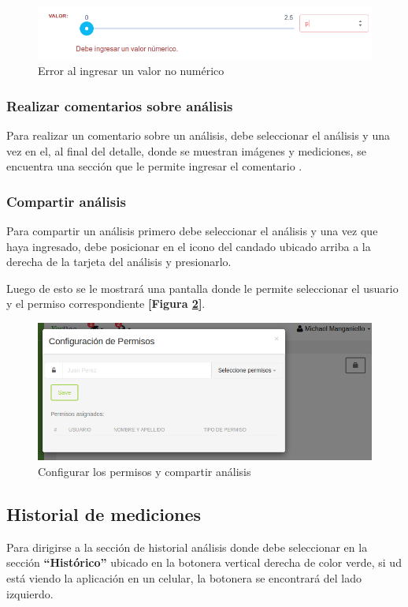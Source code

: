  
 \begin{figure}
 	\centering
 	\includegraphics[width=.8\textwidth]{img/manual_de_usuario/valor_no_numerico}
 	\caption{Error al ingresar un valor no numérico}
 	\label{mu-analisis-valor_no_numerico}
 \end{figure}
 
 

\subsubsection{Realizar comentarios sobre análisis}
Para realizar un comentario sobre un análisis, debe seleccionar el análisis y una vez en el, al final del detalle, donde se muestran imágenes y mediciones, se encuentra una sección que le permite ingresar el comentario .

\subsubsection{Compartir análisis}
Para compartir un análisis primero debe seleccionar el análisis y una vez que haya ingresado, debe posicionar en el icono del candado ubicado arriba a la derecha de la tarjeta del análisis y presionarlo. 

Luego de esto  se le mostrará una pantalla donde le permite seleccionar el usuario y el permiso correspondiente \textbf{[Figura \ref{mu-configurar_permiso}]}.

\begin{figure}
	\centering
	\includegraphics[width=.8\textwidth]{img/manual_de_usuario/configurar_permiso}
	\caption{Configurar los permisos y compartir análisis}
	\label{mu-configurar_permiso}
\end{figure}

	

\subsection{Historial de mediciones} \label{historial}
Para dirigirse a la sección de historial análisis donde debe seleccionar en la sección \textbf{``Histórico''} ubicado en la botonera vertical derecha de color verde, si ud está viendo la aplicación en un celular, la botonera se encontrará del lado izquierdo.

